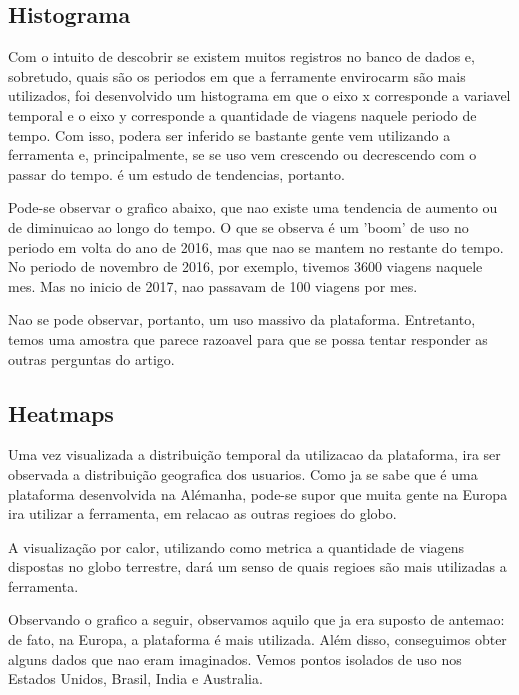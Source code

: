 \documentclass[10pt, conference]{IEEEtran}
\begin{document}
\subsection{Histograma}

Com o intuito de descobrir se existem muitos registros no banco de dados e, sobretudo,
quais são os periodos em que a ferramente envirocarm são mais utilizados, foi desenvolvido
um histograma em que o eixo x corresponde a variavel temporal e o eixo y corresponde
a quantidade de viagens naquele periodo de tempo. Com isso, podera ser inferido se bastante
gente vem utilizando a ferramenta e, principalmente, se se uso vem crescendo ou decrescendo
com o passar do tempo. é um estudo de tendencias, portanto.

Pode-se observar o grafico abaixo, que nao existe uma tendencia de aumento ou de diminuicao
ao longo do tempo. O que se observa é um 'boom' de uso no periodo em volta do ano de 2016,
mas que nao se mantem no restante do tempo. No periodo de novembro de 2016, por exemplo, 
tivemos 3600 viagens naquele mes. Mas no inicio de 2017, nao passavam de 100 viagens por mes.

Nao se pode observar, portanto, um uso massivo da plataforma. Entretanto, temos uma amostra
que parece razoavel para que se possa tentar responder as outras perguntas do artigo.



\subsection{Heatmaps}

Uma vez visualizada a distribuição temporal da utilizacao da plataforma, ira ser observada a
distribuição geografica dos usuarios. Como ja se sabe que é uma plataforma desenvolvida
na Alémanha, pode-se supor que muita gente na Europa ira utilizar a ferramenta, em relacao
as outras regioes do globo.

A visualização por calor, utilizando como metrica a quantidade de viagens dispostas no globo
terrestre, dará um senso de quais regioes são mais utilizadas a ferramenta.

Observando o grafico a seguir, observamos aquilo que ja era suposto de antemao: de fato,
na Europa, a plataforma é mais utilizada. Além disso, conseguimos obter alguns dados que nao
eram imaginados. Vemos pontos isolados de uso nos Estados Unidos, Brasil, India e Australia.
\end{document}
